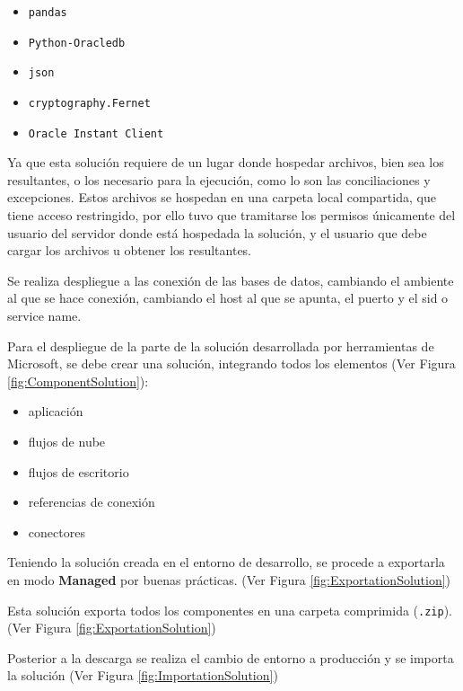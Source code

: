 \documentclass[letter,oneside,12pt,spanish]{report}
\begin{document}
\begin{itemize}
    \item \texttt{pandas}
    \item \texttt{Python-Oracledb}
    \item \texttt{json}
    \item \texttt{cryptography.Fernet}
    \item \texttt{Oracle Instant Client}
\end{itemize}

\noindent Ya que esta solución requiere de un lugar donde hospedar archivos, bien sea los resultantes, o los necesario para la ejecución, como lo son las conciliaciones y excepciones. Estos archivos se hospedan en una carpeta local compartida, que tiene acceso restringido, por ello tuvo que tramitarse los permisos únicamente del usuario del servidor donde está hospedada la solución, y el usuario que debe cargar los archivos u obtener los resultantes.

\noindent Se realiza despliegue a las conexión de las bases de datos, cambiando el ambiente al que se hace conexión, cambiando el host al que se apunta, el puerto y el sid o service name.


\noindent Para el despliegue de la parte de la solución desarrollada por herramientas de Microsoft, se debe crear una solución, integrando todos los elementos (Ver Figura \ref{fig:ComponentSolution}):

\begin{itemize}
    \item aplicación
    \item flujos de nube
    \item flujos de escritorio
    \item referencias de conexión
    \item conectores
\end{itemize}



\noindent Teniendo la solución creada en el entorno de desarrollo, se procede a exportarla en modo \textbf{Managed} por buenas prácticas. (Ver Figura \ref{fig:ExportationSolution})




\noindent Esta solución exporta todos los componentes en una carpeta comprimida (\texttt{.zip}). (Ver Figura \ref{fig:ExportationSolution})



\noindent Posterior a la descarga se realiza el cambio de entorno a producción y se importa la solución (Ver Figura \ref{fig:ImportationSolution})
\end{document}
